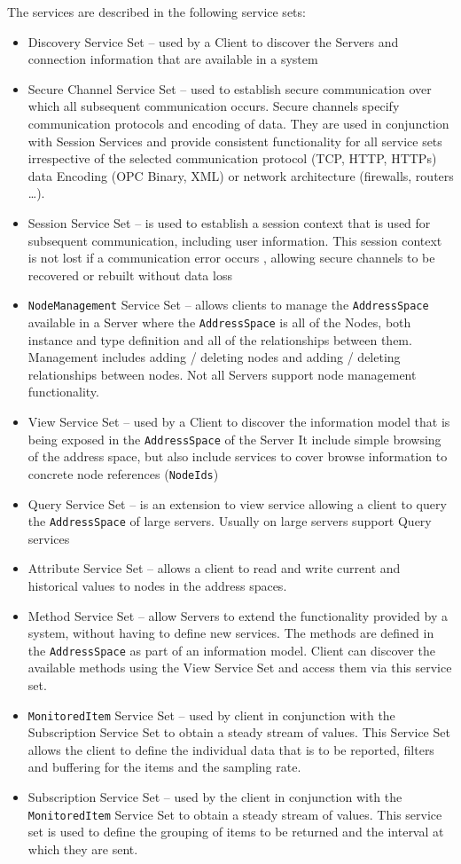 \documentclass{mtconnect}	%
\begin{document}
The services are described in the following service sets:
\begin{itemize}
\item Discovery Service Set -- used by a Client to discover the Servers and connection information that are available in a system
\item Secure Channel Service Set -- used to establish secure communication over which all subsequent communication occurs. Secure channels specify communication protocols and encoding of data. They are used in conjunction with Session Services and provide consistent functionality for all service sets irrespective of the selected communication protocol (TCP, HTTP, HTTPs) data Encoding (OPC Binary, XML) or network architecture (firewalls, routers \ldots). 
\item Session Service Set -- is used to establish a session context that is used for subsequent communication, including user information. This session context is not lost if a communication error occurs , allowing secure channels to be recovered or rebuilt without data loss
\item \texttt{NodeManagement} Service Set -- allows clients to manage the \texttt{AddressSpace} available in a Server where the \texttt{AddressSpace} is all of the Nodes, both instance and type definition and all of the relationships between them. Management includes adding / deleting nodes and adding / deleting relationships between nodes. Not all Servers support node management functionality.
\item View Service Set – used by a Client to discover the information model that is being exposed in the \texttt{AddressSpace} of the Server It include simple browsing of the address space, but also include services to cover browse information to concrete node references (\texttt{NodeIds})
\item Query Service Set -- is an extension to view service allowing a client to query the \texttt{AddressSpace} of large servers. Usually on large servers support Query services 
\item Attribute Service Set -- allows a client to read and write current and historical values to nodes in the address spaces.
\item Method Service Set -- allow Servers to extend the functionality provided by a system, without having to define new services. The methods are defined in the \texttt{AddressSpace} as part of an information model. Client can discover the available methods using the View Service Set and access them via this service set.
\item \texttt{MonitoredItem} Service Set -- used by client in conjunction with the Subscription Service Set to obtain a steady stream of values. This Service Set allows the client to define the individual data that is to be reported, filters and buffering for the items and the sampling rate.
\item Subscription Service Set -- used by the client in conjunction with the \texttt{MonitoredItem} Service Set to obtain a steady stream of values. This service set is used to define the grouping of items to be returned and the interval at which they are sent.
\end{itemize}
\end{document}
